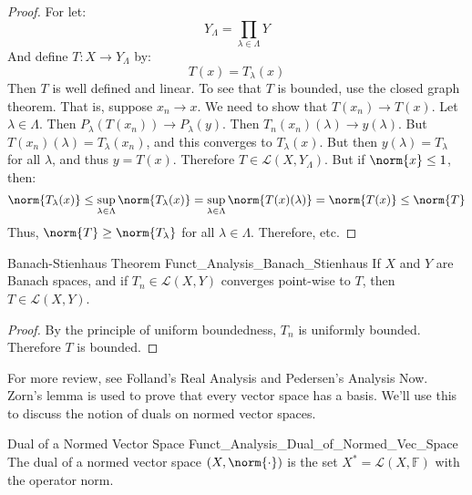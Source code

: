     \begin{proof}
        For let:
        \begin{equation}
            Y_{\Lambda}=\prod_{\lambda\in\Lambda}Y
        \end{equation}
        And define $T:X\rightarrow{Y}_{\Lambda}$ by:
        \begin{equation}
            T(x)=T_{\lambda}(x)
        \end{equation}
        Then $T$ is well defined and linear. To see
        that $T$ is bounded, use the closed graph
        theorem. That is, suppose $x_{n}\rightarrow{x}$.
        We need to show that $T(x_{n})\rightarrow{T}(x)$.
        Let $\lambda\in\Lambda$. Then
        $P_{\lambda}(T(x_{n}))\rightarrow{P}_{\lambda}(y)$.
        Then $T_{n}(x_{n})(\lambda)\rightarrow{y}(\lambda)$.
        But $T(x_{n})(\lambda)=T_{\lambda}(x_{n})$, and this
        converges to $T_{\lambda}(x)$. But then
        $y(\lambda)=T_{\lambda}$ for all $\lambda$, and
        thus $y=T(x)$. Therefore
        $T\in\mathcal{L}(X,Y_{\Lambda})$. But if
        $\norm{x}\leq{1}$, then:
        \begin{equation}
            \norm{T_{\lambda}(x)}\leq
            \sup_{\lambda\in\Lambda}\norm{T_{\lambda}(x)}
            =\sup_{\lambda\in\Lambda}\norm{T(x)(\lambda)}
            =\norm{T(x)}\leq\norm{T}
        \end{equation}
        Thus, $\norm{T}\geq\norm{T_{\lambda}}$ for all
        $\lambda\in\Lambda$. Therefore, etc.
    \end{proof}
    \begin{ltheorem}{Banach-Stienhaus Theorem}
          {Funct_Analysis_Banach_Stienhaus}
        If $X$ and $Y$ are Banach spaces, and if
        $T_{n}\in\mathcal{L}(X,Y)$ converges point-wise to
        $T$, then $T\in\mathcal{L}(X,Y)$.
    \end{ltheorem}
    \begin{proof}
        By the principle of uniform boundedness,
        $T_{n}$ is uniformly bounded. Therefore $T$ is bounded.
    \end{proof}
    For more review, see Folland's Real Analysis and
    Pedersen's Analysis Now. Zorn's lemma is used to
    prove that every vector space has a basis. We'll
    use this to discuss the notion of duals on
    normed vector spaces.
    \begin{ldefinition}{Dual of a Normed Vector Space}
          {Funct_Analysis_Dual_of_Normed_Vec_Space}
        The dual of a normed vector space $(X,\norm{\cdot})$
        is the set $X^{*}=\mathcal{L}(X,\mathbb{F})$
        with the operator norm.
    \end{ldefinition}
